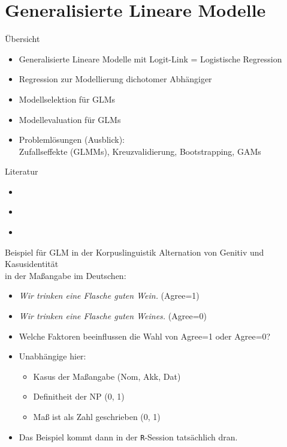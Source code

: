 \section[GLMs]{Generalisierte Lineare Modelle}

\begin{frame}
  {Übersicht}
  \begin{itemize}[<+->]
    \item Generalisierte Lineare Modelle mit Logit-Link = Logistische Regression
    \item Regression zur Modellierung dichotomer Abhängiger
    \item Modellselektion für GLMs
    \item Modellevaluation für GLMs
    \item Problemlösungen (Ausblick):\\
      Zufallseffekte (GLMMs), Kreuzvalidierung, Bootstrapping, GAMs
  \end{itemize}
\end{frame}

\begin{frame}
  {Literatur}
  \begin{itemize}
    \item \cite{BackhausEa2011}
    \item \cite{ZuurEa2009}
    \item \cite{FahrmeirEa2009}
  \end{itemize}
\end{frame}

\begin{frame}
  {Beispiel für GLM in der Korpuslinguistik}
  \alert{Alternation} von \alert{Genitiv} und \alert{Kasusidentität}\\
  in der Maßangabe im Deutschen:
  \begin{itemize}[<+->]
    \item \textit{Wir trinken eine Flasche guten Wein.} (Agree=1)
    \item \textit{Wir trinken eine Flasche guten Weines.} (Agree=0)
    \item \alert{Welche Faktoren beeinflussen die Wahl von Agree=1 oder Agree=0?}
    \item Unabhängige hier:
      \begin{itemize}
        \item \alert{Kasus} der Maßangabe (Nom, Akk, Dat)
	\item \alert{Definitheit} der NP (0, 1)
	\item \alert{Maß ist als Zahl geschrieben} (0, 1) 
      \end{itemize}
    \item Das Beispiel kommt dann in der \texttt{R}-Session tatsächlich dran.
  \end{itemize}
\end{frame}

